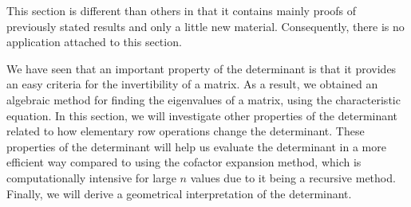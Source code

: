  \label{sec:det_properties}

\vspace*{-17 pt}

\vspace*{13 pt}





This section is different than others in that it contains mainly proofs of previously stated results and only a little new material. Consequently, there is no application attached to this section.

We have seen that an important property of the determinant is that it provides an easy criteria for the invertibility of a matrix. As a result, we obtained an algebraic method for finding the eigenvalues of a matrix, using the characteristic equation. In this section, we will investigate other properties of the determinant related to how elementary row operations change the determinant. These properties of the determinant will help us evaluate the determinant in a more efficient way compared to using the cofactor expansion method, which is computationally intensive for large $n$ values due to it being a recursive method. Finally, we will derive a geometrical interpretation of the determinant.



